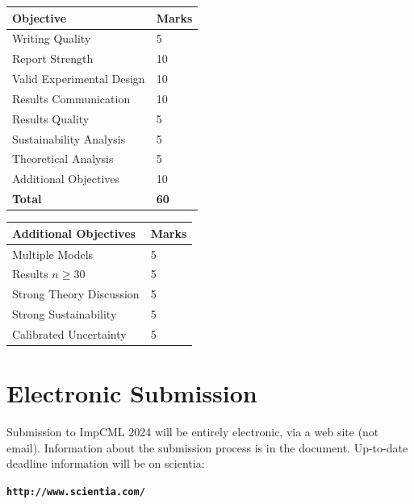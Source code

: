 \documentclass{article}
\newcommand{\csection}[1]{\section{\textcolor{imperialblue}{#1}}}
\begin{document}
\begin{table}[]\centering
\begin{tabular}{|l|l|}
\hline
\textbf{Objective}        & \textbf{Marks} \\ \hline
Writing Quality           & 5              \\ \hline
Report Strength        & 10             \\ \hline
Valid Experimental Design & 10             \\ \hline
Results Communication     & 10             \\ \hline
Results Quality & 5             \\ \hline
Sustainability Analysis   & 5              \\ \hline
Theoretical Analysis   & 5              \\ \hline
Additional Objectives      & 10             \\ \hline
\textbf{Total}                     & \textbf{60}             \\ \hline
\end{tabular}
\end{table}


\begin{table}[]\centering
\begin{tabular}{|l|l|}
\hline
\textbf{Additional Objectives}           & \textbf{Marks} \\ \hline
Multiple Models           & 5             \\ \hline
Results $n \geq 30$           & 5             \\ \hline
Strong Theory Discussion        & 5             \\ \hline
Strong Sustainability          & 5             \\ \hline
Calibrated Uncertainty          & 5             \\ \hline
\end{tabular}
\end{table}

\csection{Electronic Submission}
\label{submission}

Submission to ImpCML 2024 will be entirely electronic, via a web site
(not email). Information about the submission process is in the document. Up-to-date deadline information will be on scientia:
\begin{center}
\textbf{\texttt{http://www.scientia.com/}}
\end{center}
\end{document}
